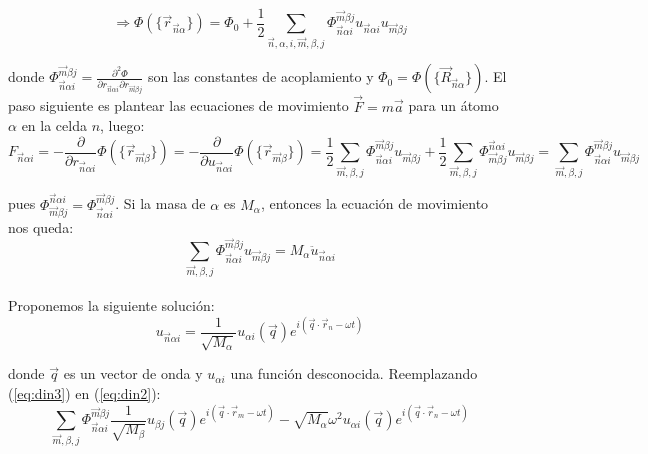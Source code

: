 \documentclass[a4paper]{article}
\begin{document}
\begin{equation}
\label{din1}
\Rightarrow \Phi(\{ \vec{r}_{\vec{n}\alpha}\}) = \Phi_{0} + \frac{1}{2}\sum_{\vec{n},\alpha, i, \vec{m}, \beta, j} \Phi^{\vec{m} \beta j}_{\vec{n}\alpha i}u_{\vec{n}\alpha i}u_{\vec{m} \beta j}
\end{equation}

donde $ \Phi^{\vec{m} \beta j}_{\vec{n}\alpha i} = \frac{\partial^{2}\Phi}{\partial r_{\vec{n}\alpha i}\partial r_{\vec{m} \beta j}} $ son las constantes de acoplamiento y $\Phi_{0} = \Phi(\{ \vec{R}_{\vec{n}\alpha}\})$. El paso siguiente es plantear las ecuaciones de movimiento $\vec{F} = m\vec{a}$ para un \'atomo $\alpha$ en la celda $n$, luego:\\

$$ F_{\vec{n}\alpha i} = -\frac{\partial}{\partial r_{\vec{n}\alpha i}} \Phi(\{ \vec{r}_{\vec{m}\beta}\}) = -\frac{\partial}{\partial u_{\vec{n}\alpha i}} \Phi(\{ \vec{r}_{\vec{m}\beta}\}) = \frac{1}{2}\sum_{\vec{m}, \beta, j} \Phi^{\vec{m} \beta j}_{\vec{n}\alpha i}u_{\vec{m} \beta j} + \frac{1}{2}\sum_{\vec{m}, \beta, j} \Phi^{\vec{n} \alpha i}_{\vec{m}\beta j}u_{\vec{m} \beta j} = \sum_{\vec{m}, \beta, j} \Phi^{\vec{m} \beta j}_{\vec{n}\alpha i}u_{\vec{m} \beta j}$$

pues $\Phi^{\vec{n} \alpha i}_{\vec{m}\beta j} = \Phi^{\vec{m} \beta j}_{\vec{n}\alpha i} $. Si la masa de $\alpha$ es $M_{\alpha}$, entonces la ecuaci\'on de movimiento nos queda:\\

\begin{equation}
\label{eq:din2}
\sum_{\vec{m}, \beta, j} \Phi^{\vec{m} \beta j}_{\vec{n}\alpha i}u_{\vec{m} \beta j} = M_{\alpha}\ddot{u}_{\vec{n} \alpha i}
\end{equation}
\\
Proponemos la siguiente soluci\'on:\\

\begin{equation}
\label{eq:din3}
u_{\vec{n} \alpha i} = \frac{1}{\sqrt{M_{\alpha}}}u_{\alpha i}(\vec{q})e^{i(\vec{q}\cdot \vec{r}_{n} - \omega t)}
\end{equation}

donde $\vec{q}$ es un vector de onda y $u_{\alpha i}$ una funci\'on desconocida. Reemplazando (\ref{eq:din3}) en (\ref{eq:din2}):\\

$$ \sum_{\vec{m}, \beta, j} \Phi^{\vec{m} \beta j}_{\vec{n}\alpha i}\frac{1}{\sqrt{M_{\beta}}}u_{\beta j}(\vec{q})e^{i(\vec{q}\cdot \vec{r}_{m} - \omega t)} - \sqrt{M_{\alpha}}\omega^{2}u_{\alpha i}(\vec{q})e^{i(\vec{q}\cdot \vec{r}_{n} - \omega t)}$$
\end{document}

